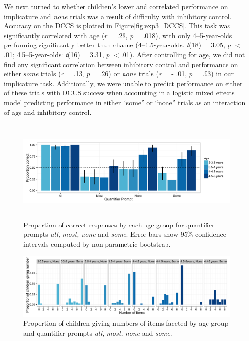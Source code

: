 \documentclass[man]{apa2}
\begin{document}
We next turned to whether children's lower and correlated performance on implicature and \textit{none} trials was a result of difficulty with inhibitory control. Accuracy on the DCCS is plotted in Figure\ref{fig:exp3_DCCS}. This task was significantly correlated with age (\textit{r} = .28, \textit{p} = .018), with only 4--5-year-olds performing significantly better than chance (4--4.5-year-olds: \emph{t}(18) = 3.05, \emph{p} $<$ .01; 4.5--5-year-olds: \emph{t}(16) = 3.31, \emph{p} $< $.01). After controlling for age, we did not find any significant correlation between inhibitory control and performance on either \textit{some} trials (\textit{r} = .13, \textit{p} = .26) or \textit{none} trials (\textit{r} = - .01, \textit{p} = .93) in our implicature task. Additionally, we were unable to predict performance on either of these trials with DCCS success when accounting in a logistic mixed effects model predicting performance in either ``some'' or ``none'' trials as an interaction of age and inhibitory control. 

\begin{figure} 
 \begin{center} 
  \includegraphics[height=2in]{figures/exp3_GQright.pdf} 
  \caption{\label{fig:exp3_GQright} Proportion of correct responses by each age group for quantifier prompts \textit{all, most, none} and \textit{some}.  Error bars show 95\% confidence intervals computed by non-parametric bootstrap.} 
 \end{center} 
\end{figure}

\begin{figure} 
 \begin{center} 
  \includegraphics[width = \textwidth]{figures/exp3_GQspread.pdf} 
  \caption{\label{fig:GQ_spread} Proportion of children giving numbers of items faceted by age group and quantifier prompts \textit{all, most, none} and \textit{some}.} 
 \end{center} 
\end{figure}
\end{document}
